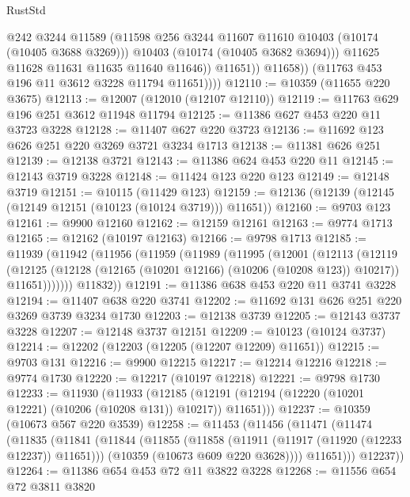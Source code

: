 \begin{lexlean}{RustStd}
\begin{coremodule}
                        @242
                        @3244
                        @11589
                        (@11598 @256 @3244 @11607 @11610 @10403 (@10174 (@10405 @3688 @3269)))
                        @10403
                        (@10174 (@10405 @3682 @3694)))
                      @11625
                      @11628
                      @11631
                      @11635
                      @11640
                      @11646))
                  @11651))
              @11658))
          (@11763 @453 @196 @11 @3612 @3228 @11794 @11651))))
@12110 := @10359 (@11655 @220 @3675)
@12113 := @12007 (@12010 (@12107 @12110))
@12119 := @11763 @629 @196 @251 @3612 @11948 @11794
@12125 := @11386 @627 @453 @220 @11 @3723 @3228
@12128 := @11407 @627 @220 @3723
@12136 := @11692 @123 @626 @251 @220 @3269 @3721 @3234 @1713
@12138 := @11381 @626 @251
@12139 := @12138 @3721
@12143 := @11386 @624 @453 @220 @11
@12145 := @12143 @3719 @3228
@12148 := @11424 @123 @220 @123
@12149 := @12148 @3719
@12151 := @10115 (@11429 @123)
@12159 := @12136 (@12139 (@12145 (@12149 @12151 (@10123 (@10124 @3719))) @11651))
@12160 := @9703 @123
@12161 := @9900 @12160
@12162 := @12159 @12161
@12163 := @9774 @1713
@12165 := @12162 (@10197 @12163)
@12166 := @9798 @1713
@12185 := @11939
    (@11942
      (@11956
        (@11959
          (@11989
            (@11995
              (@12001
                (@12113
                  (@12119
                    (@12125
                      (@12128 (@12165 (@10201 @12166) (@10206 (@10208 @123)) @10217))
                      @11651)))))))
        @11832))
@12191 := @11386 @638 @453 @220 @11 @3741 @3228
@12194 := @11407 @638 @220 @3741
@12202 := @11692 @131 @626 @251 @220 @3269 @3739 @3234 @1730
@12203 := @12138 @3739
@12205 := @12143 @3737 @3228
@12207 := @12148 @3737 @12151
@12209 := @10123 (@10124 @3737)
@12214 := @12202 (@12203 (@12205 (@12207 @12209) @11651))
@12215 := @9703 @131
@12216 := @9900 @12215
@12217 := @12214 @12216
@12218 := @9774 @1730
@12220 := @12217 (@10197 @12218)
@12221 := @9798 @1730
@12233 := @11930
    (@11933
      (@12185 (@12191 (@12194 (@12220 (@10201 @12221) (@10206 (@10208 @131)) @10217)) @11651)))
@12237 := @10359 (@10673 @567 @220 @3539)
@12258 := @11453
    (@11456
      (@11471
        (@11474
          (@11835
            (@11841
              (@11844
                (@11855
                  (@11858 (@11911 (@11917 (@11920 (@12233 @12237)) @11651)))
                  (@10359 (@10673 @609 @220 @3628))))
              @11651)))
        @12237))
@12264 := @11386 @654 @453 @72 @11 @3822 @3228
@12268 := @11556 @654 @72 @3811 @3820

\end{coremodule}
\end{lexlean}
